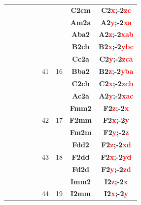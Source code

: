\documentclass{article}      %
\begin{document}
\begin{small}
\begin{longtable}[c]{|c|c|c|c|c|c|c|c|c|}
          &  & & & &  & &\textbf{C2cm}         &\textbf{C2\textcolor{red}{x};-2\textcolor{red}{zc}}\\\cline{8-9}          
          &  & & & &  & &\textbf{Am2a}         &\textbf{A2\textcolor{red}{y};-2\textcolor{red}{xa}}\\\cline{6-9}          
          &  & & & &  & &\textbf{Aba2}         &\textbf{A2\textcolor{red}{z};-2\textcolor{red}{xab}}\\\cline{8-9}         
          &  & & & &  & &\textbf{B2cb}         &\textbf{B2\textcolor{red}{x};-2\textcolor{red}{ybc}}\\\cline{8-9}         
          &  & & & &  & &\textbf{Cc2a}         &\textbf{C2\textcolor{red}{y};-2\textcolor{red}{zca}}\\\cline{8-9}         
	  &  & & & &\textrm{41}  &\textrm{16} &\textbf{Bba2}         &\textbf{B2\textcolor{red}{z};-2\textcolor{red}{yba}}\\\cline{8-9}         
          &  & & & &  & &\textbf{C2cb}         &\textbf{C2\textcolor{red}{x};-2\textcolor{red}{zcb}}\\\cline{8-9}         
          &  & & & &  & &\textbf{Ac2a}         &\textbf{A2\textcolor{red}{y};-2\textcolor{red}{xac}}\\\cline{6-9}         
          &  & & & & & &\textbf{Fmm2}         &\textbf{F2\textcolor{red}{z};-2\textcolor{red}{x}}\\\cline{8-9}           
	  &  & & & &\textrm{42}  &\textrm{17} &\textbf{F2mm}         &\textbf{F2\textcolor{red}{x};-2\textcolor{red}{y}}\\\cline{8-9}           
          &  & & & &  & &\textbf{Fm2m}         &\textbf{F2\textcolor{red}{y};-2\textcolor{red}{z}}\\\cline{6-9}           
          &  & & & &  & &\textbf{Fdd2}         &\textbf{F2\textcolor{red}{z};-2\textcolor{red}{xd}}\\\cline{8-9}          
	  &  & & & &\textrm{43}  &\textrm{18} &\textbf{F2dd}         &\textbf{F2\textcolor{red}{x};-2\textcolor{red}{yd}}\\\cline{8-9}          
          &  & & & &  & &\textbf{Fd2d}         &\textbf{F2\textcolor{red}{y};-2\textcolor{red}{zd}}\\\cline{6-9}          
          &  & & & &  & &\textbf{Imm2}         &\textbf{I2\textcolor{red}{z};-2\textcolor{red}{x}}\\\cline{8-9}           
	  &  & & & &\textrm{44}  &\textrm{19} &\textbf{I2mm}         &\textbf{I2\textcolor{red}{x};-2\textcolor{red}{y}}\\\cline{8-9}           

\end{longtable}
\end{small}
\end{document}
